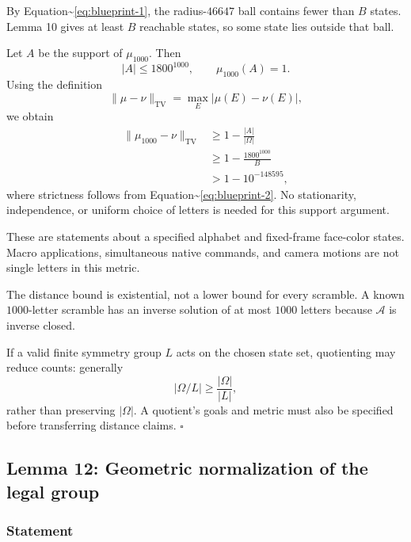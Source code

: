 \documentclass[
  10pt,
  a4paper,
]{article}
\begin{document}
By Equation\textasciitilde{}\eqref{eq:blueprint-1}, the radius-\(46647\)
ball contains fewer than \(B\) states. Lemma 10 gives at least \(B\)
reachable states, so some state lies outside that ball.

Let \(A\) be the support of \(\mu_{1000}\). Then \begin{equation}
|A|\le1800^{1000},\qquad \mu_{1000}(A)=1.
\end{equation} Using the definition \begin{equation}
\|\mu-\nu\|_{\mathrm{TV}}
=\max_E|\mu(E)-\nu(E)|,
\end{equation} we obtain \begin{equation}
\begin{aligned}
\|\mu_{1000}-\nu\|_{\mathrm{TV}}
&\ge1-\frac{|A|}{|\Omega|}\\
&\ge1-\frac{1800^{1000}}{B}\\
&>1-10^{-148595},
\end{aligned}
\end{equation} where strictness follows from
Equation\textasciitilde{}\eqref{eq:blueprint-2}. No stationarity,
independence, or uniform choice of letters is needed for this support
argument.

These are statements about a specified alphabet and fixed-frame
face-color states. Macro applications, simultaneous native commands, and
camera motions are not single letters in this metric.

The distance bound is existential, not a lower bound for every scramble.
A known \(1000\)-letter scramble has an inverse solution of at most
\(1000\) letters because \(\mathcal A\) is inverse closed.

If a valid finite symmetry group \(L\) acts on the chosen state set,
quotienting may reduce counts: generally \begin{equation}
|\Omega/L|\ge\frac{|\Omega|}{|L|},
\end{equation} rather than preserving \(|\Omega|\). A quotient's goals
and metric must also be specified before transferring distance claims.
\(\square\)

\subsection{Lemma 12: Geometric normalization of the legal
group}\label{lemma-12-geometric-normalization-of-the-legal-group}

\subsubsection{Statement}\label{statement-11}
\end{document}
